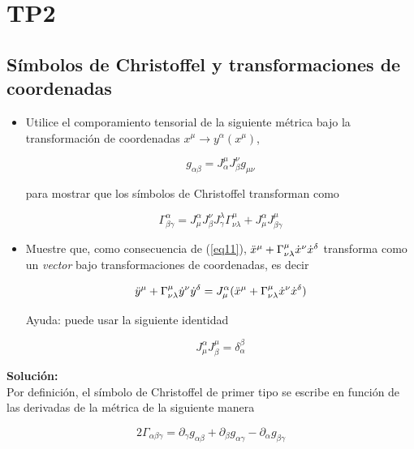 \section{TP2}
\subsection{S\'imbolos de Christoffel y transformaciones de coordenadas}

\begin{itemize}
    \item Utilice el comporamiento tensorial de la siguiente m\'etrica bajo la transformaci\'on de coordenadas $x^{\mu} \rightarrow y^{\alpha}(x^{\mu})$,

        \begin{equation}
            g_{\alpha \beta} = J^{\mu}_{\alpha}J^{\nu}_{\beta}g_{\mu \nu}
            \label{eq10}
        \end{equation}

        para mostrar que los s\'imbolos de Christoffel transforman como 

        \begin{equation}
            \Gamma^{\alpha}_{\beta \gamma} = J^{\alpha}_{\mu}J^{\nu}_{\beta}J^{\lambda}_{\gamma}\Gamma^{\mu}_{\nu \lambda} + J^{\alpha}_{\mu}J^{\mu}_{\beta \gamma}
            \label{eq11}
        \end{equation}

    \item Muestre que, como consecuencia de (\ref{eq11}), $\Ddot{x}^{\mu} +  \Gamma^{\mu}_{\nu \lambda}\Dot{x}^{\nu}\Dot{x}^{\delta}$ transforma como un \textit{vector} bajo transformaciones de coordenadas, es decir

    $$\Ddot{y}^{\mu} +  \Gamma^{\mu}_{\nu \lambda}\Dot{y}^{\nu}\Dot{y}^{\delta} = J^{\alpha}_{\mu}(\Ddot{x}^{\mu} +  \Gamma^{\mu}_{\nu \lambda}\Dot{x}^{\nu}\Dot{x}^{\delta})$$

    Ayuda: puede usar la siguiente identidad

    $$J^{\alpha}_{\mu}J^{\mu}_{\beta} = \delta_{\alpha}^{\beta}$$
\end{itemize}

\textbf{Soluci\'on:}\\

Por definici\'on, el s\'imbolo de Christoffel de primer tipo se escribe en funci\'on de las derivadas de la m\'etrica de la siguiente manera

$$2\Gamma_{\alpha \beta \gamma} = \partial_{\gamma}g_{\alpha \beta} + \partial_{\beta}g_{\alpha \gamma} - \partial_{\alpha}g_{\beta \gamma}$$\\

